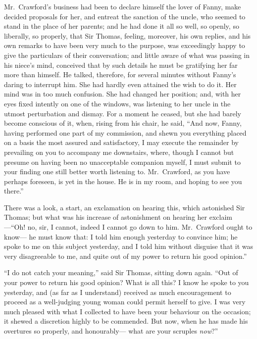 Mr.\ Crawford's business had been to declare himself
the lover of Fanny, make decided proposals for her,
and entreat the sanction of the uncle, who seemed to stand
in the place of her parents; and he had done it all so well,
so openly, so liberally, so properly, that Sir Thomas,
feeling, moreover, his own replies, and his own remarks
to have been very much to the purpose, was exceedingly
happy to give the particulars of their conversation;
and little aware of what was passing in his niece's mind,
conceived that by such details he must be gratifying her
far more than himself.  He talked, therefore, for several
minutes without Fanny's daring to interrupt him.
She had hardly even attained the wish to do it.  Her mind
was in too much confusion.  She had changed her position;
and, with her eyes fixed intently on one of the windows,
was listening to her uncle in the utmost perturbation
and dismay.  For a moment he ceased, but she had barely
become conscious of it, when, rising from his chair, he said,
``And now, Fanny, having performed one part of my commission,
and shewn you everything placed on a basis the most assured
and satisfactory, I may execute the remainder by prevailing
on you to accompany me downstairs, where, though I cannot
but presume on having been no unacceptable companion myself,
I must submit to your finding one still better worth
listening to.  Mr.\ Crawford, as you have perhaps foreseen,
is yet in the house.  He is in my room, and hoping to see
you there.''

There was a look, a start, an exclamation on hearing this,
which astonished Sir Thomas; but what was his increase of
astonishment on hearing her exclaim---``Oh! no, sir, I cannot,
indeed I cannot go down to him.  Mr.\ Crawford ought to know---%
he must know that:  I told him enough yesterday to convince him;
he spoke to me on this subject yesterday, and I told him
without disguise that it was very disagreeable to me,
and quite out of my power to return his good opinion.''

``I do not catch your meaning,'' said Sir Thomas, sitting
down again.  ``Out of your power to return his good opinion?
What is all this?  I know he spoke to you yesterday,
and (as far as I understand) received as much encouragement
to proceed as a well-judging young woman could permit
herself to give.  I was very much pleased with what I
collected to have been your behaviour on the occasion;
it shewed a discretion highly to be commended.  But now,
when he has made his overtures so properly, and honourably---%
what are your scruples \emph{now}?''

